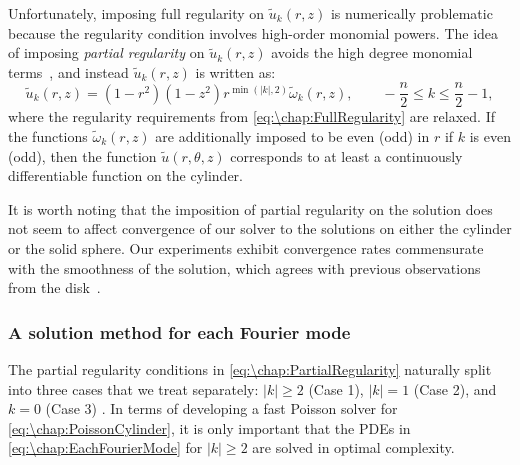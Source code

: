 Unfortunately, imposing full regularity on $\tilde{u}_k(r,z)$ is numerically problematic because the regularity condition involves high-order monomial powers. The idea of imposing 
{\em partial regularity} on $\tilde{u}_k(r,z)$ avoids the high degree monomial terms~\cite{Torres_99_01}, and instead $\tilde{u}_{k}(r,z)$ is written as:
\begin{equation}
\tilde{u}_k(r,z) = (1-r^2)(1-z^2) r^{\min(|k|,2)} \tilde{\omega}_k(r,z), \qquad -\frac{n}{2}\leq k\leq \frac{n}{2}-1,
\label{eq:\chap:PartialRegularity}
\end{equation}
where the regularity requirements from \cref{eq:\chap:FullRegularity} are relaxed.  If the functions $\tilde{\omega}_k(r,z)$ are additionally imposed to be even (odd) in $r$ if $k$ is even (odd), then the function $\tilde{u}(r,\theta,z)$ corresponds to at least a continuously differentiable function on the cylinder.

It is worth noting that the imposition of partial regularity on the solution does not seem to affect convergence of our solver to the solutions on either the cylinder or the solid sphere. Our experiments exhibit convergence rates commensurate with the smoothness of the solution, which agrees with previous observations from the disk~\cite{Torres_99_01}.

\subsubsection{A solution method for each Fourier mode}
The partial regularity conditions in \cref{eq:\chap:PartialRegularity} naturally split into three cases that we treat separately: $|k|\geq 2$ (Case 1), $|k| = 1$ (Case 2), and $k=0$ (Case 3) .  In terms of developing a fast Poisson solver for \cref{eq:\chap:PoissonCylinder}, it is only important that the PDEs in \cref{eq:\chap:EachFourierMode} for $|k|\geq 2$ are solved in optimal complexity.

